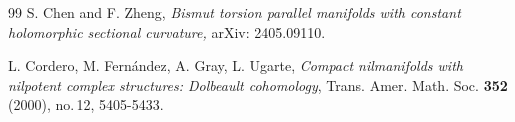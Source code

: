 \documentclass{amsart}
\begin{document}
\begin{thebibliography}{99}
 S. Chen and F. Zheng, \emph{Bismut torsion parallel manifolds with constant holomorphic sectional curvature,} arXiv: 2405.09110.









 L. Cordero, M. Fern\'{a}ndez, A. Gray, L. Ugarte, \emph{Compact nilmanifolds with nilpotent complex structures: Dolbeault cohomology}, Trans. Amer. Math. Soc. {\bf 352} (2000), no.\,12, 5405-5433.










\end{thebibliography}
\end{document}
